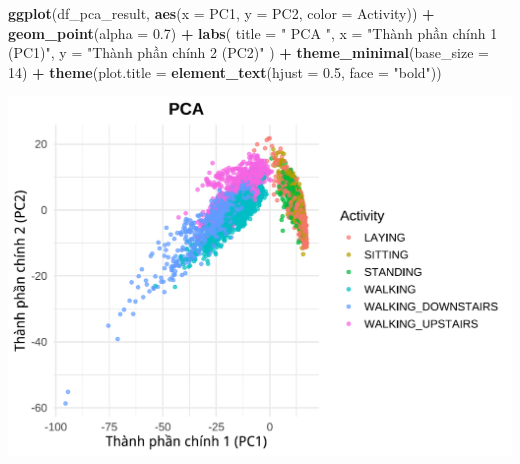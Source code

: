 \documentclass[
]{article}
\newenvironment{Shaded}{\begin{snugshade}}{\end{snugshade}}
\newcommand{\AttributeTok}[1]{\textcolor[rgb]{0.13,0.29,0.53}{#1}}
\newcommand{\CommentTok}[1]{\textcolor[rgb]{0.56,0.35,0.01}{\textit{#1}}}
\newcommand{\ConstantTok}[1]{\textcolor[rgb]{0.56,0.35,0.01}{#1}}
\newcommand{\DecValTok}[1]{\textcolor[rgb]{0.00,0.00,0.81}{#1}}
\newcommand{\FloatTok}[1]{\textcolor[rgb]{0.00,0.00,0.81}{#1}}
\newcommand{\FunctionTok}[1]{\textcolor[rgb]{0.13,0.29,0.53}{\textbf{#1}}}
\newcommand{\NormalTok}[1]{#1}
\newcommand{\OtherTok}[1]{\textcolor[rgb]{0.56,0.35,0.01}{#1}}
\newcommand{\SpecialCharTok}[1]{\textcolor[rgb]{0.81,0.36,0.00}{\textbf{#1}}}
\newcommand{\StringTok}[1]{\textcolor[rgb]{0.31,0.60,0.02}{#1}}
\begin{document}
\begin{Shaded}
\end{Shaded}

\begin{Shaded}
\begin{Highlighting}[]
\FunctionTok{ggplot}\NormalTok{(df\_pca\_result, }\FunctionTok{aes}\NormalTok{(}\AttributeTok{x =}\NormalTok{ PC1, }\AttributeTok{y =}\NormalTok{ PC2, }\AttributeTok{color =}\NormalTok{ Activity)) }\SpecialCharTok{+}
  \FunctionTok{geom\_point}\NormalTok{(}\AttributeTok{alpha =} \FloatTok{0.7}\NormalTok{) }\SpecialCharTok{+}
  \FunctionTok{labs}\NormalTok{(}
    \AttributeTok{title =} \StringTok{" PCA "}\NormalTok{,}
    \AttributeTok{x =} \StringTok{"Thành phần chính 1 (PC1)"}\NormalTok{,}
    \AttributeTok{y =} \StringTok{"Thành phần chính 2 (PC2)"}
\NormalTok{  ) }\SpecialCharTok{+}
  \FunctionTok{theme\_minimal}\NormalTok{(}\AttributeTok{base\_size =} \DecValTok{14}\NormalTok{) }\SpecialCharTok{+}
  \FunctionTok{theme}\NormalTok{(}\AttributeTok{plot.title =} \FunctionTok{element\_text}\NormalTok{(}\AttributeTok{hjust =} \FloatTok{0.5}\NormalTok{, }\AttributeTok{face =} \StringTok{"bold"}\NormalTok{))}
\end{Highlighting}
\end{Shaded}

\includegraphics{report_files/figure-latex/unnamed-chunk-26-1.pdf}
\end{document}

